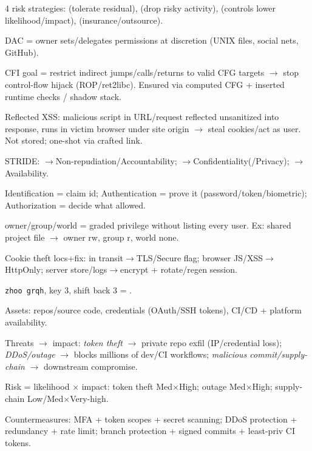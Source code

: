 {
 4 risk strategies:  (tolerate residual),  (drop risky activity),  (controls lower likelihood/impact),  (insurance/outsource).\par
{} DAC = owner sets/delegates permissions at discretion (UNIX files, social nets, GitHub).\par
{} CFI goal = restrict indirect jumps/calls/returns to valid CFG targets $\to$ stop control-flow hijack (ROP/ret2libc). Ensured via computed CFG + inserted runtime checks / shadow stack.\par
{} Reflected XSS: malicious script in URL/request reflected unsanitized into response, runs in victim browser under site origin $\to$ steal cookies/act as user. Not stored; one-shot via crafted link.\par
{} STRIDE: $\to$Non-repudiation/Accountability; $\to$Confidentiality(/Privacy); $\to$Availability.\par
{} Identification = claim id; Authentication = prove it (password/token/biometric); Authorization = decide what allowed.\par
{} owner/group/world = graded privilege without listing every user. Ex: shared project file $\to$ owner rw, group r, world none.\par
{} Cookie theft locs+fix: in transit$\to$TLS/Secure flag; browser JS/XSS$\to$HttpOnly; server store/logs$\to$encrypt + rotate/regen session.\par
{} \texttt{zhoo grqh}, key 3, shift back 3 = .\par

 Assets: repos/source code, credentials (OAuth/SSH tokens), CI/CD + platform availability.\par
{} Threats $\to$ impact: \textit{token theft} $\to$ private repo exfil (IP/credential loss); \textit{DDoS/outage} $\to$ blocks millions of dev/CI workflows; \textit{malicious commit/supply-chain} $\to$ downstream compromise.\par
{} Risk = likelihood $\times$ impact: token theft Med$\times$High; outage Med$\times$High; supply-chain Low/Med$\times$Very-high.\par
{} Countermeasures: MFA + token scopes + secret scanning; DDoS protection + redundancy + rate limit; branch protection + signed commits + least-priv CI tokens.\par

}
